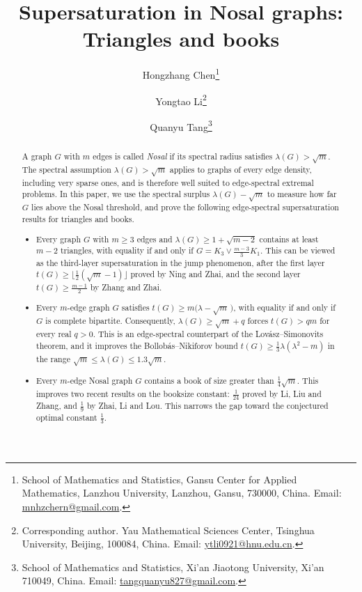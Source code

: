 \documentclass[11pt,a4paper]{article}
\title{Supersaturation in Nosal graphs: Triangles and books}
\date{}
\theoremstyle{definition}
\theoremstyle{plain}
\renewcommand{\le}{\leqslant}
\renewcommand{\ge}{\geqslant}
\begin{document}
\author{
Hongzhang Chen\thanks{School of Mathematics and Statistics, 
Gansu Center for Applied Mathematics, 
Lanzhou University, Lanzhou, Gansu, 730000, China. Email: \url{mnhzchern@gmail.com}.} 
\and 
Yongtao Li\thanks{Corresponding author. Yau Mathematical Sciences Center, Tsinghua University, Beijing, 100084, China. 
Email: \url{ytli0921@hnu.edu.cn}.}
\and 
Quanyu Tang\thanks{School of Mathematics and Statistics, Xi'an Jiaotong University, Xi'an 710049, China.
Email: \url{tangquanyu827@gmail.com}.}
}

\maketitle

\vspace{-0.4cm}

\begin{abstract}
A graph $G$ with $m$ edges is called \emph{Nosal} if its spectral radius satisfies 
$\lambda(G) > \sqrt{m}$. The spectral assumption $\lambda(G) > \sqrt{m}$ applies to 
 graphs of every edge density, including very sparse ones, and is therefore well suited to edge-spectral extremal problems. In this paper, we use the spectral surplus 
$\lambda(G) - \sqrt{m}$ to measure how far $G$ lies above the Nosal threshold, and 
prove the following edge-spectral supersaturation results for triangles and books.

\begin{itemize}
    \item Every graph $G$ with $m\ge 3$ edges and $\lambda(G) \ge 1 + \sqrt{m-2}$ contains at least $m-2$ triangles, with equality if and only if $G = K_3 \vee \tfrac{m-3}{3} K_1$. 
    This can be viewed as the third-layer supersaturation in the jump phenomenon, after the first layer $t(G) \ge \lfloor \tfrac{1}{2}(\sqrt{m}-1) \rfloor$ proved by Ning and Zhai, and the second layer $t(G) \ge \tfrac{m-1}{2}$ by Zhang and Zhai.

    \item Every $m$-edge graph $G$ satisfies 
    $t(G) \ge m\bigl(\lambda - \sqrt{m}\,\bigr)$, with equality if and only if $G$ 
    is complete bipartite. Consequently, $\lambda(G) \ge \sqrt{m} + q$ forces 
    $t(G) > q m$ for every real $q > 0$. This is an edge-spectral counterpart of the 
    Lov\'asz--Simonovits theorem, and it improves the Bollob\'as--Nikiforov bound 
    $t(G) \ge \tfrac13 \lambda(\lambda^2 - m)$ in the range 
$\sqrt m \le \lambda(G) \le 1.3\sqrt m $.

    \item Every $m$-edge Nosal graph $G$ contains a book of size greater than 
    $\tfrac14 \sqrt{m}$. This improves two recent results on the booksize constant: $\tfrac{1}{24}$ proved by Li, Liu and Zhang, and $\tfrac19$ by Zhai, Li and Lou. 
    This narrows the gap toward the conjectured optimal constant $\tfrac13$. 


\end{itemize}
\end{abstract}
\end{document}
